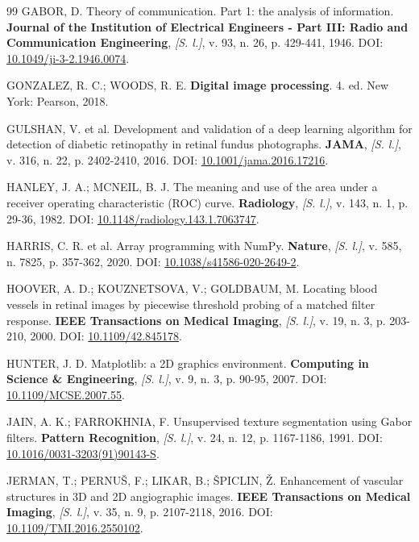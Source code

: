\documentclass[12pt, oneside, a4paper, chapter=TITLE, section=TITLE,
               english, brazil]{abntex2}
\newcommand{\doi}[1]{DOI: \href{https://doi.org/#1}{#1}}
\newcommand{\semlocal}{\textit{[S. l.]}}
\begin{document}
\begin{thebibliography}{99}
GABOR, D. Theory of communication. Part 1: the analysis of information.
\textbf{Journal of the Institution of Electrical Engineers - Part III: Radio
and Communication Engineering}, \semlocal, v. 93, n. 26, p. 429-441, 1946.
\doi{10.1049/ji-3-2.1946.0074}.

GONZALEZ, R. C.; WOODS, R. E. \textbf{Digital image processing}. 4. ed. New
York: Pearson, 2018.

GULSHAN, V. et al. Development and validation of a deep learning algorithm
for detection of diabetic retinopathy in retinal fundus photographs.
\textbf{JAMA}, \semlocal, v. 316, n. 22, p. 2402-2410, 2016.
\doi{10.1001/jama.2016.17216}.

HANLEY, J. A.; MCNEIL, B. J. The meaning and use of the area under a receiver
operating characteristic (ROC) curve. \textbf{Radiology}, \semlocal, v. 143,
n. 1, p. 29-36, 1982. \doi{10.1148/radiology.143.1.7063747}.

HARRIS, C. R. et al. Array programming with NumPy. \textbf{Nature},
\semlocal, v. 585, n. 7825, p. 357-362, 2020.
\doi{10.1038/s41586-020-2649-2}.

HOOVER, A. D.; KOUZNETSOVA, V.; GOLDBAUM, M. Locating blood vessels in
retinal images by piecewise threshold probing of a matched filter response.
\textbf{IEEE Transactions on Medical Imaging}, \semlocal, v. 19, n. 3,
p. 203-210, 2000. \doi{10.1109/42.845178}.

HUNTER, J. D. Matplotlib: a 2D graphics environment. \textbf{Computing in
Science \& Engineering}, \semlocal, v. 9, n. 3, p. 90-95, 2007.
\doi{10.1109/MCSE.2007.55}.

JAIN, A. K.; FARROKHNIA, F. Unsupervised texture segmentation using Gabor
filters. \textbf{Pattern Recognition}, \semlocal, v. 24, n. 12,
p. 1167-1186, 1991. \doi{10.1016/0031-3203(91)90143-S}.

JERMAN, T.; PERNUŠ, F.; LIKAR, B.; ŠPICLIN, Ž. Enhancement of vascular
structures in 3D and 2D angiographic images. \textbf{IEEE Transactions on
Medical Imaging}, \semlocal, v. 35, n. 9, p. 2107-2118, 2016.
\doi{10.1109/TMI.2016.2550102}.


\end{thebibliography}
\end{document}
